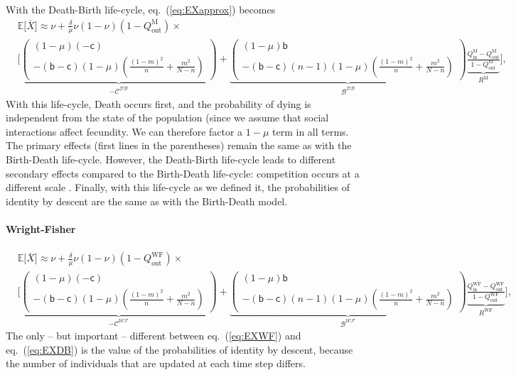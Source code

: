 \documentclass[11pt, letterpaper]{article}
\renewcommand{\eqref}[1]{\textup{{\normalfont eq.~(\ref{#1}}\normalfont)}}
\newcommand{\Esp}[1]{\mathbb{E}\big[ #1\big]}%
\newcommand{\bb}{\mathsf{b}}
\newcommand{\cc}{\mathsf{c}}
\newcommand{\Moran}{\textrm{M}}
\newcommand{\DB}{\textrm{DB}}
\newcommand{\WF}{\textrm{WF}}
\newcommand{\mutbias}{\nu}
\newcommand{\inn}{\textrm{in}}
\newcommand{\out}{\textrm{out}}
\newcommand{\selstr}{\delta}
\begin{document}
With the Death-Birth life-cycle, \eqref{eq:EXapprox} becomes
%
\begin{equation}\label{eq:EXDB}
\begin{split}
& \Esp{\overline{X}} \approx \mutbias + 
 \frac{\selstr}{\mu}  \mutbias (1-\mutbias) (1 - Q_{\out}^{\Moran}) \times \\
 &\Bigg[ \underbrace{ \begin{pmatrix}
 (1-\mu) (-\cc) \\
- (\bb - \cc) (1-\mu) \left( \frac{(1-m)^2}{n} + \frac{m^2}{N-n}\right) 
 \end{pmatrix}
}_{-\mathcal{C^{\DB}}} + \underbrace{ \begin{pmatrix}
(1-\mu) \bb \\
- (\bb - \cc) (n-1) (1-\mu)\left( \frac{(1-m)^2}{n} + \frac{m^2}{N-n} \right) 
\end{pmatrix}
}_{\mathcal{B^{\DB}}} \underbrace{\frac{Q_{\inn}^{\Moran} - Q_{\out}^{\Moran}}{1 - Q_{\out}^{\Moran}}}_{R^{\Moran}} \Bigg],
\end{split}
\end{equation}
%
With this life-cycle, Death occurs first, and the probability of dying is independent from the state of the population (since we assume that social interactions affect fecundity. We can therefore factor a $1-\mu$ term in all terms. The primary effects (first lines in the parentheses) remain the same as with the Birth-Death life-cycle. However, the Death-Birth life-cycle leads to different secondary effects compared to the Birth-Death life-cycle: competition occurs at a different scale \citep{GrafenArchetti2008}.
Finally, with this life-cycle as we defined it, the probabilities of identity by descent are the same as with the Birth-Death model. 

\paragraph{Wright-Fisher}

\begin{equation}\label{eq:EXWF}
\begin{split}
& \Esp{\overline{X}}  \approx \mutbias + 
\frac{\selstr}{\mu}  \mutbias (1-\mutbias) (1 - Q_{\out}^{\WF}) \times \\
 &\Bigg[ \underbrace{ \begin{pmatrix}
 (1-\mu) (-\cc) \\
- (\bb - \cc) (1-\mu) \left( \frac{(1-m)^2}{n} + \frac{m^2}{N-n}\right) 
 \end{pmatrix}
}_{-\mathcal{C^{\WF}}} + \underbrace{ \begin{pmatrix}
(1-\mu) \bb \\
- (\bb - \cc) (n-1)(1-\mu) \left( \frac{(1-m)^2}{n} + \frac{m^2}{N-n} \right) 
\end{pmatrix}
}_{\mathcal{B^{\WF}}} \underbrace{\frac{Q_{\inn}^{\WF} - Q_{\out}^{\WF}}{1 - Q_{\out}^{\WF}}}_{R^{\WF}} \Bigg],
\end{split}
\end{equation}
%
The only -- but important -- different between \eqref{eq:EXWF} and \eqref{eq:EXDB} is the value of the probabilities of identity by descent, because the number of individuals that are updated at each time step differs. 
\end{document}
